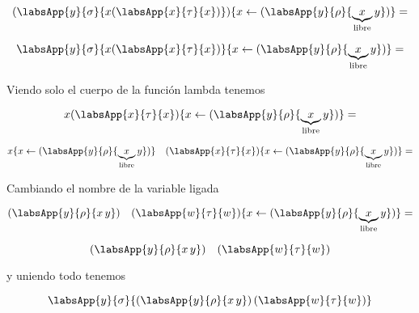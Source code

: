 \begin{center}
\end{center}

 \[ (\labsApp{y}{\sigma}{x (\labsApp{x}{\tau}{x})})\{ x \leftarrow
(\labsApp{y}{\rho}{\underbrace{x}_{\text{libre}} y}) \}  = \]

\[ \labsApp{y}{\sigma}{x (\labsApp{x}{\tau}{x})}\{ x \leftarrow
(\labsApp{y}{\rho}{\underbrace{x}_{\text{libre}} y}) \}  = \]

\noindent Viendo solo el cuerpo de la función lambda tenemos

\[ x (\labsApp{x}{\tau}{x})\{ x \leftarrow
(\labsApp{y}{\rho}{\underbrace{x}_{\text{libre}} y}) \}  = \]


\[ x\{ x \leftarrow (\labsApp{y}{\rho}{\underbrace{x}_{\text{libre}} y}) \}
\quad (\labsApp{x}{\tau}{x}) \{ x \leftarrow (\labsApp{y}{\rho}{\underbrace{x}_{\text{libre}} y}) \}
= \]

\noindent Cambiando el nombre de la variable ligada

\[ (\labsApp{y}{\rho}{x \, y})  \quad (\labsApp{w}{\tau}{w}) \{ x \leftarrow (\labsApp{y}{\rho}{\underbrace{x}_{\text{libre}} y}) \}
= \]

\[ (\labsApp{y}{\rho}{x \, y})  \quad (\labsApp{w}{\tau}{w}) \]

\noindent y uniendo todo tenemos

\begin{exbox}
    \[ \labsApp{y}{\sigma}{ (\labsApp{y}{\rho}{x \, y})  \,
    (\labsApp{w}{\tau}{w}) } \]
\end{exbox}
